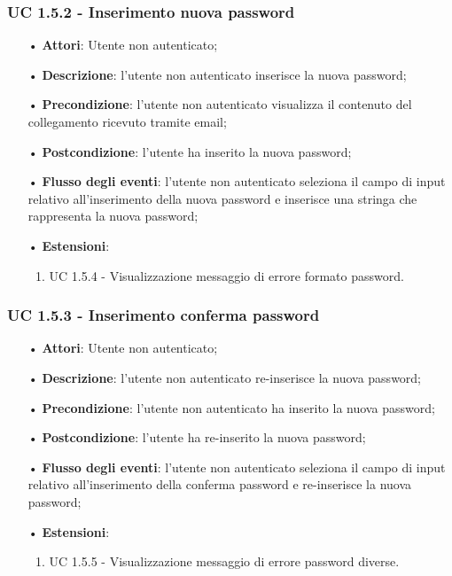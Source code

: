 \subsubsection{UC 1.5.2 - Inserimento nuova password}
\begin{itemize}
	\item[•]\textbf{Attori}: Utente non autenticato;
	\item[•]\textbf{Descrizione}: l’utente non autenticato inserisce la nuova password;
	\item[•]\textbf{Precondizione}: l’utente non autenticato visualizza il contenuto del collegamento ricevuto tramite email;
	\item[•]\textbf{Postcondizione}: l'utente ha inserito la nuova password;
	\item[•]\textbf{Flusso degli eventi}: l'utente non autenticato seleziona il campo di input relativo all'inserimento della nuova password e inserisce una stringa che rappresenta la nuova password;
	\item[•]\textbf{Estensioni}:
	\begin{enumerate}
		\item UC 1.5.4 - Visualizzazione messaggio di errore formato password.
	\end{enumerate}
\end{itemize}

\subsubsection{UC 1.5.3 - Inserimento conferma password}
\begin{itemize}
	\item[•]\textbf{Attori}: Utente non autenticato;
	\item[•]\textbf{Descrizione}: l’utente non autenticato re-inserisce la nuova password;
	\item[•]\textbf{Precondizione}: l’utente non autenticato ha inserito la nuova password;
	\item[•]\textbf{Postcondizione}: l'utente ha re-inserito la nuova password;
	\item[•]\textbf{Flusso degli eventi}: l'utente non autenticato seleziona il campo di input relativo all'inserimento della conferma password e re-inserisce la nuova password;
	\item[•]\textbf{Estensioni}:
	\begin{enumerate}
		\item UC 1.5.5 - Visualizzazione messaggio di errore password diverse.
	\end{enumerate}
\end{itemize}

